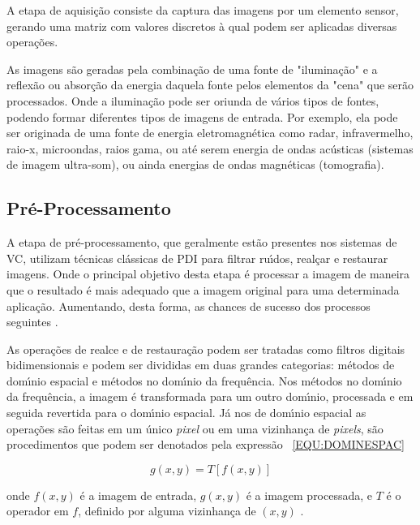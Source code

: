 A etapa de aquisi\c{c}\~{a}o consiste da captura das imagens por um elemento sensor, gerando uma matriz com valores discretos \`{a} qual podem 
ser aplicadas diversas opera\c{c}\~{o}es\cite{GONZALEZ:2008}.

As imagens s\~{a}o geradas pela combina\c{c}\~{a}o de uma fonte de "ilumina\c{c}\~{a}o" e a reflex\~{a}o ou absor\c{c}\~{a}o da energia daquela fonte pelos 
elementos da "cena" que ser\~{a}o processados. Onde a ilumina\c{c}\~{a}o pode ser oriunda de v\'{a}rios tipos de fontes, podendo formar diferentes 
tipos de imagens de entrada. Por exemplo, ela pode ser originada de uma fonte de energia eletromagn\'{e}tica como radar, 
infravermelho, raio-x, microondas, raios gama, ou at\'{e} serem energia de ondas ac\'{u}sticas (sistemas de imagem ultra-som), ou ainda 
energias de ondas magn\'{e}ticas (tomografia)\cite{GONZALEZ:2007}\cite{AUZUIR:2005}.

\subsection{Pr\'{e}-Processamento}

A etapa de pr\'{e}-processamento, que geralmente est\~{a}o presentes nos sistemas de \ac{VC}, utilizam t\'{e}cnicas cl\'{a}ssicas de \ac{PDI} para 
filtrar ru\'{\i}dos, real\c{c}ar e restaurar imagens. Onde o principal objetivo desta etapa \'{e} processar a imagem de maneira que o resultado 
\'{e} mais adequado que a imagem original para uma determinada aplica\c{c}\~{a}o. Aumentando, desta forma, as chances de sucesso dos processos 
seguintes \cite{GONZALEZ:2007}.

As opera\c{c}\~{o}es de realce e de restaura\c{c}\~{a}o podem ser tratadas como filtros digitais bidimensionais e podem ser divididas em duas 
grandes categorias: m\'{e}todos de dom\'{\i}nio espacial e m\'{e}todos no dom\'{\i}nio da frequ\^{e}ncia. Nos m\'{e}todos no dom\'{\i}nio da frequ\^{e}ncia, a imagem 
\'{e} transformada para um outro dom\'{\i}nio, processada e em seguida revertida para o dom\'{\i}nio espacial. J\'{a} nos de dom\'{\i}nio espacial as 
opera\c{c}\~{o}es s\~{a}o feitas em um \'{u}nico \emph{pixel} ou em uma vizinhan\c{c}a de \emph{pixels}, s\~{a}o procedimentos que podem ser denotados 
pela express\~{a}o ~\ref{EQU:DOMINESPAC}

\begin{equation}
\label{EQU:DOMINESPAC}
g(x,y) = T[f(x,y)]
\end{equation}

onde $f(x,y)$ \'{e} a imagem de entrada, $g(x,y)$ \'{e} a imagem processada, e $T$ \'{e} o operador em $f$, definido por alguma vizinhan\c{c}a de 
$(x,y)$ \cite{GONZALEZ:2007}\cite{PITAS:2000}.

